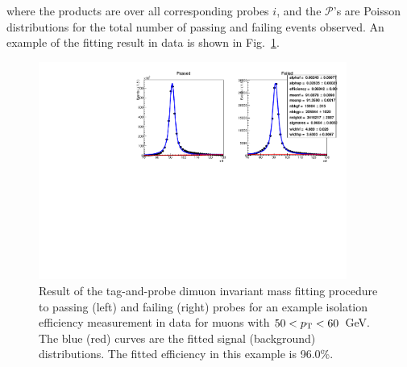 where the products are over all corresponding probes $i$, and the 
$\mathcal{P}$'s are Poisson distributions for the total number of passing and 
failing events observed.
An example of the fitting result in data is shown in Fig.~\ref{fig:tnp}.

\begin{figure}[h]
\includegraphics[width=0.9\textwidth]{figs/analysis/muonIsolationTight_mll_all_muonDefaultPtBins_pt50-60_Data}
\caption{Result of the tag-and-probe dimuon invariant mass fitting procedure to 
passing (left) and failing (right) probes for an example isolation efficiency 
measurement in data for muons with $50<{p_{\text T}}<60$~GeV. The blue (red) curves are 
the fitted signal (background) distributions. The fitted efficiency in this 
example is 96.0\%.}
\label{fig:tnp}
\end{figure}

